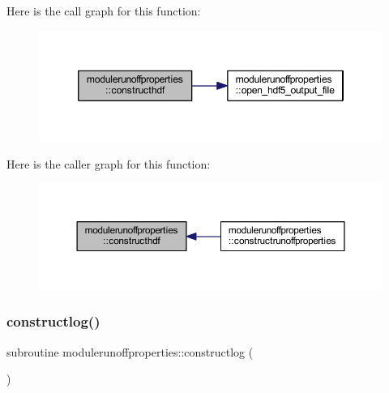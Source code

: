 Here is the call graph for this function\+:\nopagebreak
\begin{figure}[H]
\begin{center}
\leavevmode
\includegraphics[width=346pt]{namespacemodulerunoffproperties_ab553b53f61f80a77a664735dc1b72d44_cgraph}
\end{center}
\end{figure}
Here is the caller graph for this function\+:\nopagebreak
\begin{figure}[H]
\begin{center}
\leavevmode
\includegraphics[width=350pt]{namespacemodulerunoffproperties_ab553b53f61f80a77a664735dc1b72d44_icgraph}
\end{center}
\end{figure}
\mbox{\label{namespacemodulerunoffproperties_a5ed964a29d4214b1f4cb89bf338fc96b}} 
\subsubsection{\texorpdfstring{constructlog()}{constructlog()}}
{\footnotesize\ttfamily subroutine modulerunoffproperties\+::constructlog (\begin{DoxyParamCaption}{ }\end{DoxyParamCaption})\hspace{0.3cm}{\ttfamily [private]}}

